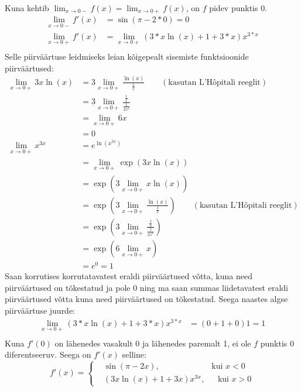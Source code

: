 \documentclass{article}
\begin{document}
Kuna kehtib $‬\displaystyle\lim_{x\to0-}f(x)=\lim_{x\to0+}f(x)$, on $f$ pidev punktis 0.
\begin{equation*}
\begin{aligned}
\lim_{x\to0-}f'(x)&=\sin(\pi-2*0)=0\\
\lim_{x\to0+}f'(x)&=\lim_{x\to0+}\left(3*x\ln(x)+1+3*x\right)x^{3*x}\\
\end{aligned}
\end{equation*}
Selle piirv\"a\"artuse leidmiseks leian k\~oigepealt sisemiste funktsioonide piirv\"a\"artused:
\begin{equation*}
\begin{aligned}
\lim_{x\to0+}3x\ln(x)&=3\lim_{x\to0+}\frac{\ln(x)}{\frac{1}{x}}\qquad(\text{kasutan L'H\^opitali reeglit})\\
&=3\lim_{x\to0+}\frac{\frac{1}{x}}{\frac{1}{2x^2}}\\
&=\lim_{x\to0+}6x\\
&=0\\
\lim_{x\to0+}x^{3x}&=e^{\ln(x^{3x})}\\
&=\lim_{x\to0+}\exp(3x\ln(x))\\
&=\exp\left(3\lim_{x\to0+}x\ln(x)\right)\\
&=\exp\left(3\lim_{x\to0+}\frac{\ln(x)}{\frac{1}{x}}\right)\qquad(\text{kasutan L'H\^opitali reeglit})\\
&=\exp\left(3\lim_{x\to0+}\frac{\frac{1}{x}}{\frac{1}{2x^2}}\right)\\
&=\exp \left(6\lim_{x\to0+}x\right)\\
&=e^0=1
\end{aligned}
\end{equation*}
Saan korrutises korrutatavatest eraldi piirv\"a\"artused v\~otta, kuna need piirv\"a\"artused on t\~okestatud ja pole 0 ning ma saan summas liidetavatest eraldi piirv\"a\"artused v\~otta kuna need piirv\"a\"artused on t\~okestatud. Seega naastes algse piirv\"a\"artuse juurde:\\
\begin{equation*}
\begin{aligned}
\lim_{x\to0+}\left(3*x\ln(x)+1+3*x\right)x^{3*x}&=(0+1+0)1=1\\
\end{aligned}
\end{equation*}
Kuna $f'(0)$ on l\"ahenedes vasakult 0 ja l\"ahenedes paremalt 1, ei ole $f$ punktis 0 diferentseeruv. Seega on $f'(x)$ selline:
\begin{equation*}
f'(x)=
\left\{
\begin{aligned}
&\sin(\pi-2x),\qquad\qquad\qquad\text{ kui }x<0\\
&(3x\ln(x)+1+3x)x^{3x},\quad\ \text{ kui }x>0
\end{aligned}
\right.
\end{equation*}
\end{document}
